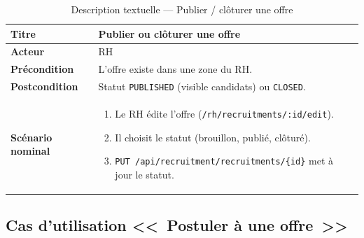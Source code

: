 \begin{table}[htbp]
  \centering
  \small
  \caption{Description textuelle --- Publier / clôturer une offre}
  \label{tab:uc-publish-offer}
  \begin{tabular}{|p{3.0cm}|p{10.2cm}|}
    \hline
    \textbf{Titre} & Publier ou clôturer une offre \\
    \hline
    \textbf{Acteur} & RH \\
    \hline
    \textbf{Précondition} & L'offre existe dans une zone du RH. \\
    \hline
    \textbf{Postcondition} & Statut \texttt{PUBLISHED} (visible candidats) ou \texttt{CLOSED}. \\
    \hline
    \textbf{Scénario nominal}
    &
    \begin{enumerate}[leftmargin=*,itemsep=0.15em,topsep=0.2em]
      \item Le RH édite l'offre (\texttt{/rh/recruitments/:id/edit}).
      \item Il choisit le statut (brouillon, publié, clôturé).
      \item \texttt{PUT /api/recruitment/recruitments/\{id\}} met à jour le statut.
    \end{enumerate}
    \\
    \hline
  \end{tabular}
\end{table}


\subsection{Cas d'utilisation <<~Postuler à une offre~>>}

